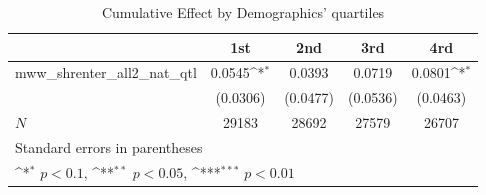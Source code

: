 \begin{table}[htbp]\centering
\def\sym#1{\ifmmode^{#1}\else\(^{#1}\)\fi}
\caption{Cumulative Effect by Demographics' quartiles}
\begin{tabular}{l*{4}{c}}
\hline\hline
            &\multicolumn{1}{c}{1st}&\multicolumn{1}{c}{2nd}&\multicolumn{1}{c}{3rd}&\multicolumn{1}{c}{4rd}\\
\hline
mww\_shrenter\_all2\_nat\_qtl&      0.0545\sym{*}  &      0.0393         &      0.0719         &      0.0801\sym{*}  \\
            &    (0.0306)         &    (0.0477)         &    (0.0536)         &    (0.0463)         \\
\hline
\(N\)       &       29183         &       28692         &       27579         &       26707         \\
\hline\hline
\multicolumn{5}{l}{\footnotesize Standard errors in parentheses}\\
\multicolumn{5}{l}{\footnotesize \sym{*} \(p<0.1\), \sym{**} \(p<0.05\), \sym{***} \(p<0.01\)}\\
\end{tabular}
\end{table}
